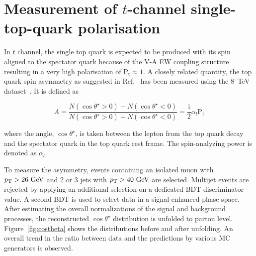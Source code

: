 \documentclass{PoS}
\begin{document}
\section{Measurement of $t$-channel single-top-quark polarisation}

In $t$ channel, the single top quark is expected to be produced with its spin aligned to the spectator quark because of the V-A EW coupling structure resulting in a very high polarisation of $\mathrm{P_t}\approx1$. A closely related quantity, the top quark spin asymmetry as suggested in Ref.~\cite{wbeyond} has been measured using the 8~TeV dataset~\cite{CMS-PAS-TOP-13-001}. It is defined as 

\begin{equation}
A=\frac{N(\cos\theta^{\star}>0)-N(\cos\theta^{\star}<0)}{N(\cos\theta^{\star}>0)+N(\cos\theta^{\star}<0)}=\frac{1}{2}\alpha_{l}\mathrm{P_{t}}
\end{equation}

where the angle, $\cos\theta^{\star}$, is taken between the lepton from the top quark decay and the spectator quark in the top quark rest frame. The spin-analyzing power is denoted as $\alpha_{l}$.

To measure the asymmetry, events containing an isolated muon with $p_\mathrm{T}>26~\mathrm{GeV}$ and 2 or 3 jets with $p_\mathrm{T}>40~\mathrm{GeV}$ are selected. Multijet events are rejected by applying an additional selection on a dedicated BDT discriminator value. A second BDT is used to select data in a signal-enhanced phase space. After estimating the overall normalizations of the signal and background processes, the reconstructed $\cos\theta^{\star}$ distribution is unfolded to parton level. Figure~\ref{fig:costheta} shows the distributions before and after unfolding. An overall trend in the ratio between data and the predictions by various MC generators is observed.
\end{document}
